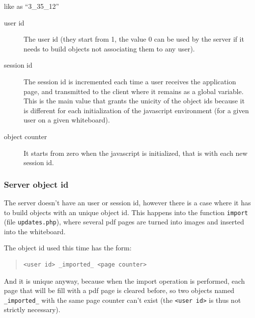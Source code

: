 \documentclass[10pt,a4paper,english]{book}
\begin{document}
like as ``3{\_}35{\_}12''
\begin{description}
\item[{user id}] \leavevmode 
The user id (they start from 1, the value 0 can be used by the
server if it needs to build objects not associating them to any
user).

\item[{session id}] \leavevmode 
The session id is incremented each time a user receives the
application page, and transmitted to the client where it remains
as a global variable. This is the main value that grants the
unicity of the object ids because it is different for each
initialization of the javascript environment (for a given user on
a given whiteboard).

\item[{object counter}] \leavevmode 
It starts from zero when the javascript is initialized, that is
with each new session id.

\end{description}



\hypertarget{server-object-id}{}
\subsubsection{Server object id}
\label{server-object-id}

The server doesn't have an user or session id, however there is a case
where it has to build objects with an unique object id. This happens
into the function \texttt{import} (file \texttt{updates.php}), where several pdf
pages are turned into images and inserted into the whiteboard.

The object id used this time has the form:
\begin{quote}\begin{verbatim}
<user id> _imported_ <page counter>
\end{verbatim}
\end{quote}

And it is unique anyway, because when the import operation is
performed, each page that will be fill with a pdf page is cleared
before, so two objects named \texttt{{\_}imported{\_}} with the same page counter
can't exist (the \texttt{<user id>} is thus not strictly necessary).



\hypertarget{action-parameters}{}
\end{document}
